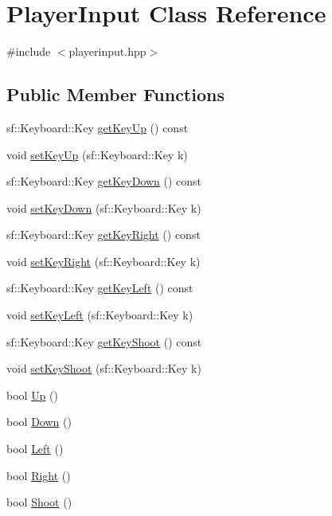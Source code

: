 \hypertarget{classPlayerInput}{}\section{Player\+Input Class Reference}
\label{classPlayerInput}


{\ttfamily \#include $<$playerinput.\+hpp$>$}

\subsection*{Public Member Functions}
\begin{DoxyCompactItemize}
\item 
sf\+::\+Keyboard\+::\+Key \hyperlink{classPlayerInput_a349bd5b6c64f170e88b409f2ce5384f3}{get\+Key\+Up} () const
\item 
void \hyperlink{classPlayerInput_ac28c127fd9a00d9983061057548e8d6b}{set\+Key\+Up} (sf\+::\+Keyboard\+::\+Key k)
\item 
sf\+::\+Keyboard\+::\+Key \hyperlink{classPlayerInput_a5186c06d0e7f5553787f60ba5673d0cb}{get\+Key\+Down} () const
\item 
void \hyperlink{classPlayerInput_aef9ce827dd9c97f7657e6a53188d63ae}{set\+Key\+Down} (sf\+::\+Keyboard\+::\+Key k)
\item 
sf\+::\+Keyboard\+::\+Key \hyperlink{classPlayerInput_aa046d257f45b62228d6de973d120f391}{get\+Key\+Right} () const
\item 
void \hyperlink{classPlayerInput_a5f09a7c77ae9c20f8246be5eda9856b8}{set\+Key\+Right} (sf\+::\+Keyboard\+::\+Key k)
\item 
sf\+::\+Keyboard\+::\+Key \hyperlink{classPlayerInput_a010e08e15347be2891655f8687a37dcb}{get\+Key\+Left} () const
\item 
void \hyperlink{classPlayerInput_a3025371e730b36a0ae1cb6ec7391e7f8}{set\+Key\+Left} (sf\+::\+Keyboard\+::\+Key k)
\item 
sf\+::\+Keyboard\+::\+Key \hyperlink{classPlayerInput_aa63de3b5eb312b8e5be58dc3b9ef8648}{get\+Key\+Shoot} () const
\item 
void \hyperlink{classPlayerInput_aeae833b00ec51fb096811a828b4b6e9b}{set\+Key\+Shoot} (sf\+::\+Keyboard\+::\+Key k)
\item 
bool \hyperlink{classPlayerInput_a2cd0fa6c370da0294219c326d251ba75}{Up} ()
\item 
bool \hyperlink{classPlayerInput_a0ddb6706f436832085c6e857ce1b6876}{Down} ()
\item 
bool \hyperlink{classPlayerInput_a7b1446e7877945b3361ea2775b182725}{Left} ()
\item 
bool \hyperlink{classPlayerInput_aa9aa970dfc19149b06ff07d956a1cd93}{Right} ()
\item 
bool \hyperlink{classPlayerInput_a5acff106260290af275b0559f8f72dd9}{Shoot} ()
\end{DoxyCompactItemize}


